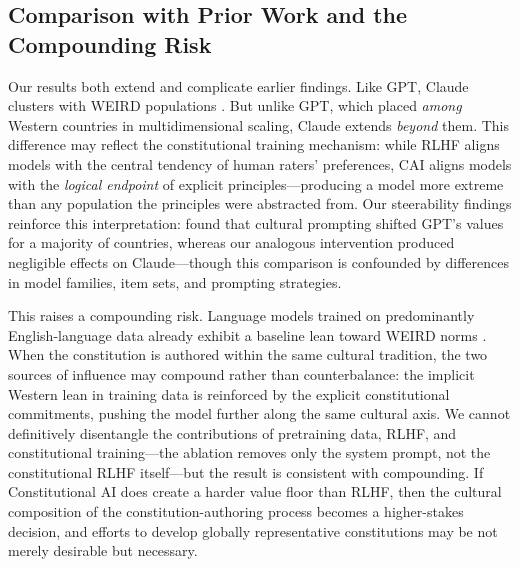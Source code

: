 \documentclass{article}
\begin{document}
\subsection{Comparison with Prior Work and the Compounding Risk}

Our results both extend and complicate earlier findings. Like GPT, Claude clusters with WEIRD populations \citep{atari2023which}. But unlike GPT, which \citet{atari2023which} placed \textit{among} Western countries in multidimensional scaling, Claude extends \textit{beyond} them. This difference may reflect the constitutional training mechanism: while RLHF \citep{ouyang2022training} aligns models with the central tendency of human raters' preferences, CAI aligns models with the \textit{logical endpoint} of explicit principles---producing a model more extreme than any population the principles were abstracted from. Our steerability findings reinforce this interpretation: \citet{tao2024cultural} found that cultural prompting shifted GPT's values for a majority of countries, whereas our analogous intervention produced negligible effects on Claude---though this comparison is confounded by differences in model families, item sets, and prompting strategies.

This raises a compounding risk. Language models trained on predominantly English-language data already exhibit a baseline lean toward WEIRD norms \citep{johnson2022ghost, naous2024having}. When the constitution is authored within the same cultural tradition, the two sources of influence may compound rather than counterbalance: the implicit Western lean in training data is reinforced by the explicit constitutional commitments, pushing the model further along the same cultural axis. We cannot definitively disentangle the contributions of pretraining data, RLHF, and constitutional training---the ablation removes only the system prompt, not the constitutional RLHF itself---but the result is consistent with compounding. If Constitutional AI does create a harder value floor than RLHF, then the cultural composition of the constitution-authoring process becomes a higher-stakes decision, and efforts to develop globally representative constitutions may be not merely desirable but necessary.
\end{document}
